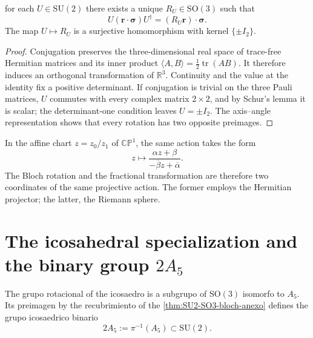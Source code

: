 \begin{theorem}
\label{thm:SU2-SO3-bloch-anexo}
for each \(U\in\mathrm{SU}(2)\) there exists a unique
\(R_U\in\mathrm{SO}(3)\) such that
\begin{equation}
 U(\boldsymbol r\cdot\boldsymbol\sigma)U^\dagger
 =(R_U\boldsymbol r)\cdot\boldsymbol\sigma.
 \label{eq:accion-SU2-bloch-anexo}
\end{equation}
The map \(U\mapsto R_U\) is a surjective homomorphism with kernel
\(\{\pm I_2\}\).
\end{theorem}

\begin{proof}
Conjugation preserves the three-dimensional real space of trace-free Hermitian
matrices and its inner product
\(\langle A,B\rangle=\tfrac12\operatorname{tr}(AB)\). It therefore induces an
orthogonal transformation of \(\mathbb R^3\). Continuity and the value at the
identity fix a positive determinant. If conjugation is trivial on the
three Pauli matrices, \(U\) commutes with every complex matrix \(2\times2\),
and by Schur's lemma it is scalar; the determinant-one condition leaves
\(U=\pm I_2\). The axis--angle representation shows that every rotation has
two opposite preimages.
\end{proof}

In the affine chart \(z=z_0/z_1\) of \(\mathbb{CP}^{1}\), the same action takes
the form
\begin{equation}
 z\longmapsto
 \frac{\alpha z+\beta}
      {-\overline\beta z+\overline\alpha}.
 \label{eq:mobius-SU2-anexo}
\end{equation}
The Bloch rotation and the fractional transformation are therefore two
coordinates of the same projective action. The former employs the Hermitian
projector; the latter, the Riemann sphere.

\section{The icosahedral specialization and the binary group \texorpdfstring{\(2A_5\)}{2A5}}

The grupo rotacional of the icosaedro is a subgrupo of
\(\mathrm{SO}(3)\) isomorfo to \(A_5\). Its preimagen by the recubrimiento of the
\cref{thm:SU2-SO3-bloch-anexo} defines the grupo icosaedrico binario
\begin{equation}
 2A_5:=\pi^{-1}(A_5)\subset\mathrm{SU}(2).
 \label{eq:def-2A5-anexo}
\end{equation}

